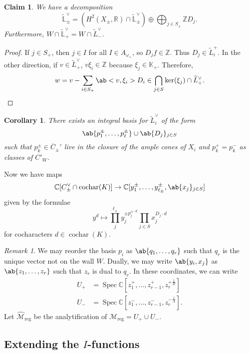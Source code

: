 \documentclass[leqno, openany]{memoir}
\newtheorem{cor}[thm]{Corollary}
\newtheorem{claim}[thm]{Claim}
\theoremstyle{definition}
\theoremstyle{remark}
\newtheorem{rmk}[thm]{Remark}
\theoremstyle{plain}
\theoremstyle{definition}
\theoremstyle{remark}
\newcommand{\R}{\mathbb{R}}
\newcommand{\C}{\mathbb{C}}
\newcommand{\Z}{\mathbb{Z}}
\renewcommand{\K}{\mathbb{K}}
\renewcommand{\L}{\mathbb{L}}
\newcommand{\mc}[1]{\mathcal{#1}}
\newcommand{\mr}[1]{\mathrm{#1}}
\newcommand{\on}[1]{\operatorname{#1}}
\newcommand{\ol}[1]{\overline{#1}}
\newcommand{\wt}[1]{\widetilde{#1}}
\newcommand{\wh}[1]{\widehat{#1}}
\DeclareMathOperator{\Spec}{Spec}
\begin{document}
\begin{claim}
    We have a decomposition
    \[ \wt{\L}_{\pm}^{\vee} = (H^2(X_{\pm}, \R) \cap \wt{\L}_{\pm}^{\vee}) \oplus\bigoplus_{j \in S_{\pm}} \Z D_j. \]
    Furthermore, $W \cap \wt{\L}_+^{\vee} = W \cap \wt{L}_-^{\vee}$.
\end{claim}

\begin{proof}
    If $j \in S_+$, then $j \in I$ for all $I \in A_{\omega_+}$, so $D_j f \in \Z$. Thus $D_j \in \wt{L}_i^{+}$. In the other direction, if $v \in \wt{L}_+^{\vee}$, $v \xi_i \in \Z$ because $\xi_j \in \K_+$. Therefore,
    \[ w = v - \sum_{i \in S_+} \ab<v,\xi_i> D_i \in \bigcap_{j \in S}\ker(\xi_j) \cap \wt{L}_+^{\vee}. \qedhere \]
\end{proof}

\begin{cor}
    There exists an integral basis for $\wt{L}_i^{\vee}$ of the form
    \[ \ab\{ p_1^{\pm}, \ldots, p_{\ell}^{\pm}\} \cup \ab\{D_j\}_{j \in S} \]
    such that $p_k^{\pm} \in \ol{C}_{\pm}'$ live in the closure of the ample cones of $X_i$ and $p_k^+ = p_k^-$ as classes of $C'_W$.
\end{cor}

Now we have maps
\[ \C[C_{\pm}^{\vee} \cap \on{cochar}(K)] \to \C[y_1^{\pm}, \ldots, y_{\ell_{\pm}}^{\pm}, \ab\{x_j\}_{j \in S}] \]
given by the formulae
\[ y^d \mapsto \prod_{j}^{\ell_{\pm}} y_j^{\pm p_j^{\pm \cdot d}} \prod_{j\in S} x_j^{D_j \cdot d} \]
for cocharacters $d \in \on{cochar}(K)$.

\begin{rmk}
    We may reorder the basis $p_i$ as $\ab\{q_1, \ldots, q_r\}$ such that $q_r$ is the unique vector not on the wall $W$. Dually, we may write $\ab\{y_i, x_j\}$ as $\ab\{z_1, \ldots, z_r\}$ such that $z_r$ is dual to $q_r$. In these coordinates, we can write
    \begin{align*}
        U_+ &= \Spec \C[z_1^+, \ldots, z_{r-1}^+, z_r^{+ \frac{1}{B}}] \\
        U_- &= \Spec \C[z_1^-, \ldots, z_{r-1}^-, z_r^{- \frac{1}{A}}] .
    \end{align*}
    Let $\wh{\mc{M}}_{\mr{reg}}$ be the analytification of $\mc{M}_{\mr{reg}} = U_+ \cup U_-$.
\end{rmk}

\subsection{Extending the $I$-functions}%
\label{sub:Extending the $I$-functions}
\end{document}
